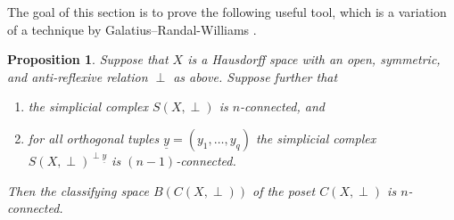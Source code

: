 \documentclass{amsart}
\theoremstyle{plain}
\newtheorem{prop}[thm]{Proposition}
\theoremstyle{definition}
\renewcommand{\ul}[1]{\underline{#1}}
\begin{document}
The goal of this section is to prove the following useful tool, which is a variation of a technique by Galatius--Randal-Williams \cite{GalatiusRandalWilliams}.
\begin{prop} \label{prop - poset discretization}
    Suppose that $X$ is a Hausdorff space with an open, symmetric, and anti-reflexive relation $\perp$ as above.
    Suppose further that 
    \begin{enumerate}
        \item the simplicial complex $S(X, \perp)$ is $n$-connected, and
        \item for all orthogonal tuples $\ul{y} = (y_1, \dots, y_q)$ the simplicial complex $S(X, \perp)^{\perp \ul{y}}$ is $(n-1)$-connected. 
    \end{enumerate}
    Then the classifying space $B(C(X,\perp))$ of the poset $C(X,\perp)$ is $n$-connected.
\end{prop}
\end{document}
